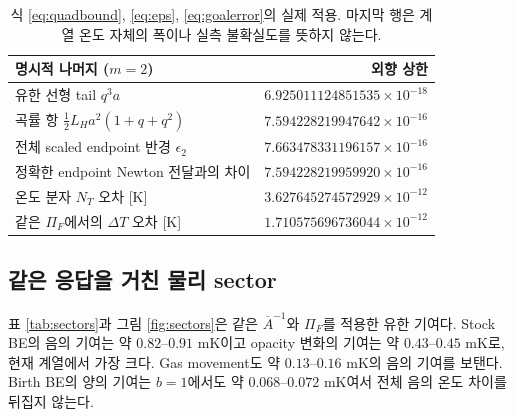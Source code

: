 \begin{table}[H]
\centering\small
\begin{tabularx}{\textwidth}{@{}X r@{}}
\toprule
명시적 나머지 ($m=2$) & 외향 상한\\\midrule
유한 선형 tail $q^3a$ & $6.925011124851535\times10^{-18}$\\
곡률 항 $\tfrac12L_Ha^2(1+q+q^2)$ & $7.594228219947642\times10^{-16}$\\
전체 scaled endpoint 반경 $\epsilon_2$ & $7.663478331196157\times10^{-16}$\\
정확한 endpoint Newton 전달과의 차이 & $7.594228219959920\times10^{-16}$\\
온도 분자 $N_T$ 오차 [K] & $3.627645274572929\times10^{-12}$\\
같은 $\Pi_F$에서의 $\Delta T$ 오차 [K] & $1.710575696736044\times10^{-12}$\\
\bottomrule
\end{tabularx}
\caption{식 \eqref{eq:quadbound}, \eqref{eq:eps}, \eqref{eq:goalerror}의 실제 적용. 마지막 행은 계열 온도 자체의 폭이나 실측 불확실도를 뜻하지 않는다.}
\label{tab:tails}
\end{table}

\subsection{같은 응답을 거친 물리 sector}
표 \ref{tab:sectors}과 그림 \ref{fig:sectors}은 같은 $\overline A^{-1}$와 $\Pi_F$를 적용한 유한 기여다. Stock BE의 음의 기여는 약 $0.82$--$0.91$ mK이고 opacity 변화의 기여는 약 $0.43$--$0.45$ mK로, 현재 계열에서 가장 크다. Gas movement도 약 $0.13$--$0.16$ mK의 음의 기여를 보탠다. Birth BE의 양의 기여는 $b=1$에서도 약 $0.068$--$0.072$ mK여서 전체 음의 온도 차이를 뒤집지 않는다.


